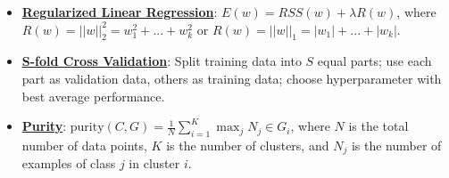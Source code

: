 \documentclass{article}%
\begin{document}
\begin{itemize}[leftmargin=*]
\item \href{https://purdue.brightspace.com/d2l/common/assets/pdfjs-d2l-dist/1.0.14-legacy/web/viewer.html?file=\%2Fcontent\%2Fenforced\%2F1095467-wl.202510.CS.24300.001\%2F10L1-CrossValidation.pdf\%3Fou\%3D1095467\&lang=en-us\&container=d2l-fileviewer-rendered-pdf\&fullscreen=d2l-fileviewer-rendered-pdf-dialog\&height=667#page=17}{\textbf{Regularized Linear Regression}}: $E(w) = RSS(w) + \lambda R(w)$, where $R(w) = ||w||_2^2 = w_1^2 + ... + w_k^2$ or $R(w) = ||w||_1 = |w_1| + ... + |w_k|$.%
\item \href{https://purdue.brightspace.com/d2l/common/assets/pdfjs-d2l-dist/1.0.14-legacy/web/viewer.html?file=\%2Fcontent\%2Fenforced\%2F1095467-wl.202510.CS.24300.001\%2F10L1-CrossValidation.pdf\%3Fou\%3D1095467\&lang=en-us\&container=d2l-fileviewer-rendered-pdf\&fullscreen=d2l-fileviewer-rendered-pdf-dialog\&height=667#page=25}{\textbf{S-fold Cross Validation}}: Split training data into $S$ equal parts; use each part as validation data, others as training data; choose hyperparameter with best average performance.%
\item \href{https://purdue.brightspace.com/d2l/common/assets/pdfjs-d2l-dist/1.0.14-legacy/web/viewer.html?file=\%2Fcontent\%2Fenforced\%2F1095467-wl.202510.CS.24300.001\%2F12L2-distance-clusters.pdf\%3Fou\%3D1095467\&lang=en-us\&container=d2l-fileviewer-rendered-pdf\&fullscreen=d2l-fileviewer-rendered-pdf-dialog\&height=667#page=44}{\textbf{Purity}}: $\text{purity}(C, G) = \frac{1}{N} \sum_{i=1}^{K} \max_j N_j \in G_i$, where $N$ is the total number of data points, $K$ is the number of clusters, and $N_j$ is the number of examples of class $j$ in cluster $i$.%
\end{itemize}

%
\end{document}

